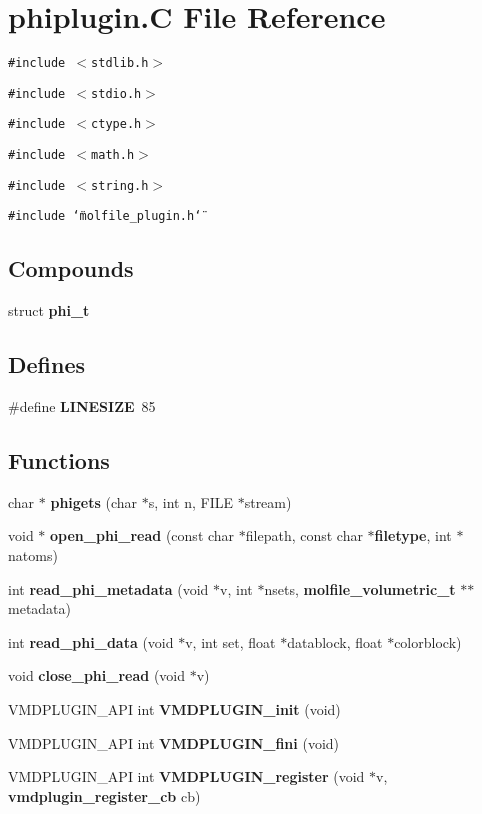 \section{phiplugin.C File Reference}
\label{phiplugin_8C}
{\tt \#include $<$stdlib.h$>$}\par
{\tt \#include $<$stdio.h$>$}\par
{\tt \#include $<$ctype.h$>$}\par
{\tt \#include $<$math.h$>$}\par
{\tt \#include $<$string.h$>$}\par
{\tt \#include \char`\"{}molfile\_\-plugin.h\char`\"{}}\par
\subsection*{Compounds}
\begin{CompactItemize}
\item 
struct {\bf phi\_\-t}
\end{CompactItemize}
\subsection*{Defines}
\begin{CompactItemize}
\item 
\#define {\bf LINESIZE}\ 85
\end{CompactItemize}
\subsection*{Functions}
\begin{CompactItemize}
\item 
char $\ast$ {\bf phigets} (char $\ast$s, int n, FILE $\ast$stream)
\item 
void $\ast$ {\bf open\_\-phi\_\-read} (const char $\ast$filepath, const char $\ast${\bf filetype}, int $\ast$natoms)
\item 
int {\bf read\_\-phi\_\-metadata} (void $\ast$v, int $\ast$nsets, {\bf molfile\_\-volumetric\_\-t} $\ast$$\ast$metadata)
\item 
int {\bf read\_\-phi\_\-data} (void $\ast$v, int set, float $\ast$datablock, float $\ast$colorblock)
\item 
void {\bf close\_\-phi\_\-read} (void $\ast$v)
\item 
VMDPLUGIN\_\-API int {\bf VMDPLUGIN\_\-init} (void)
\item 
VMDPLUGIN\_\-API int {\bf VMDPLUGIN\_\-fini} (void)
\item 
VMDPLUGIN\_\-API int {\bf VMDPLUGIN\_\-register} (void $\ast$v, {\bf vmdplugin\_\-register\_\-cb} cb)
\end{CompactItemize}
